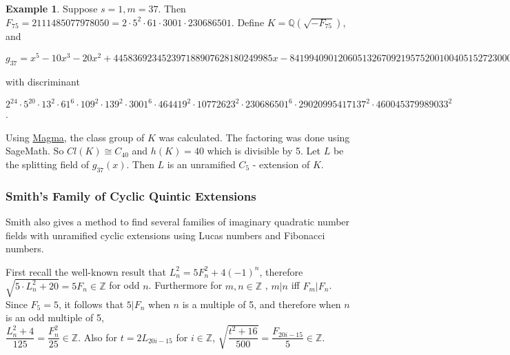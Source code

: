\documentclass[12pt]{extarticle}
\newcommand{\Q}{\mathbb{Q}}
\newcommand{\Z}{\mathbb{Z}}
\newcommand{\<}{\langle}
\renewcommand{\>}{\rangle}
\theoremstyle{definition}
\newtheorem{example}{Example}
\begin{document}
\begin{example}
Suppose $s=1, m= 37$. Then $F_{75} = 2111485077978050 = 2 \cdot 5^2 \cdot 61 \cdot 3001 \cdot 230686501$. Define $K = \Q(\sqrt{-F_{75}})$, and 

\begin{center}
$g_{37} = x^5 - 10x^3 - 20x^2 + 445836923452397188907628180249985x  - 841994090120605132670921957520010040515272300004
$
\end{center}
with discriminant 

\begin{center}
$2^{24} \cdot 5^{20} \cdot 13^2 \cdot 61^6 \cdot 109^2 \cdot 139^2 \cdot 3001^6 \cdot 464419^2 \cdot 10772623^2 \cdot 230686501^6 \cdot 29020995417137^2 \cdot 460045379989033^2$. 
\end{center}

Using \href{http://magma.maths.usyd.edu.au/calc/}{Magma}, the class group of $K$ was calculated. The factoring was done using SageMath. So $Cl(K) \cong C_{40} $ and $h(K) = 40$ which is divisible by 5. Let $L$ be the splitting field of $g_{37}(x)$. Then $L$ is an unramified $C_5$ - extension of $K$. 
\end{example}


\subsubsection{Smith's Family of Cyclic Quintic Extensions}
Smith \cite{SMITH} also gives a method to find several families of imaginary quadratic number fields with unramified cyclic extensions using Lucas numbers and Fibonacci numbers. \par
 First recall the well-known result that $L_n^2 = 5F_n^2+4(-1)^n$, therefore $\sqrt{5 \cdot L_n^2+20} = 5F_n \in \Z$ for odd $n$. Furthermore for $m,n \in \Z$ , $m|n$ iff $F_m | F_n$. Since $F_5 = 5$, it follows that $5| F_n $ when $n$ is a multiple of 5, and therefore when $n$ is an odd multiple of 5, \\ $\dfrac{L_n^2+4}{125} = \dfrac{F_n^2}{25} \in \Z$. Also for $t = 2L_{20i-15}$ for $i \in \Z$, $\sqrt{\dfrac{t^2+16}{500}} = \dfrac{F_{20i-15}}{5} \in \Z$. \\ \par 
\end{document}
